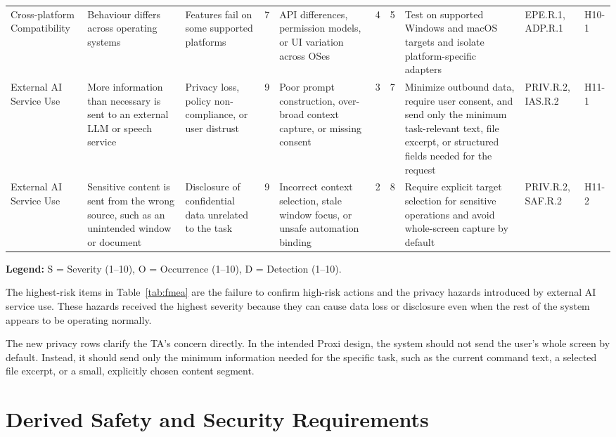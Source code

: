 \documentclass[12pt]{article}
\begin{document}
\begin{landscape}
\begin{longtable}{p{2.7cm} p{2.9cm} p{3.0cm} c p{3.2cm} c c p{4.0cm}
  p{2.2cm} p{1.5cm}}
Cross-platform Compatibility &
Behaviour differs across operating systems &
Features fail on some supported platforms &
7 &
API differences, permission models, or UI variation across OSes &
4 &
5 &
Test on supported Windows and macOS targets and isolate
platform-specific adapters &
EPE.R.1, ADP.R.1 &
H10-1 \\

External AI Service Use &
More information than necessary is sent to an external LLM or speech
service &
Privacy loss, policy non-compliance, or user distrust &
9 &
Poor prompt construction, over-broad context capture, or missing
consent &
3 &
7 &
Minimize outbound data, require user consent, and send only the
minimum task-relevant text, file excerpt, or structured fields
needed for the request &
PRIV.R.2, IAS.R.2 &
H11-1 \\

External AI Service Use &
Sensitive content is sent from the wrong source, such as an unintended
window or document &
Disclosure of confidential data unrelated to the task &
9 &
Incorrect context selection, stale window focus, or unsafe
automation binding &
2 &
8 &
Require explicit target selection for sensitive operations and avoid
whole-screen capture by default &
PRIV.R.2, SAF.R.2 &
H11-2 \\

\end{longtable}

\vspace{0.3cm}
\noindent\textbf{Legend:} S = Severity (1--10), O = Occurrence (1--10),
D = Detection (1--10).

\end{landscape}
\clearpage

The highest-risk items in Table~\ref{tab:fmea} are the failure to confirm
high-risk actions and the privacy hazards introduced by external AI service
use. These hazards received the highest severity because they can cause data
loss or disclosure even when the rest of the system appears to be operating
normally.

The new privacy rows clarify the TA's concern directly. In the intended
Proxi design, the system should not send the user's whole screen by default.
Instead, it should send only the minimum information needed for the specific
task, such as the current command text, a selected file excerpt, or a small,
explicitly chosen content segment.

\section{Derived Safety and Security Requirements}
\end{document}

